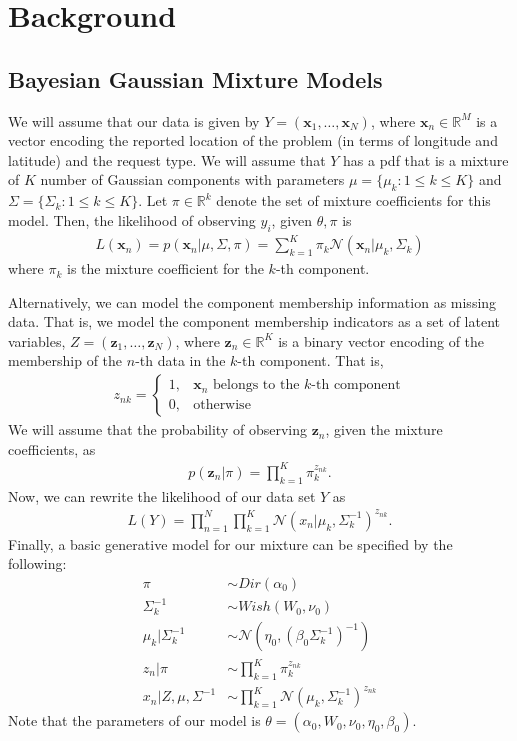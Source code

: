 \documentclass[twoside]{article}
\newcommand{\N}{\mathcal{N}}
\newcommand{\bR}{\mathbb{R}}
\newcommand{\vx}{\mathbf{x}}
\newcommand{\vz}{\mathbf{z}}
\theoremstyle{theorem}
\theoremstyle{theorem}
\theoremstyle{theorem}
\theoremstyle{lemma}
\theoremstyle{definition}
\theoremstyle{example}
\begin{document}
\section{Background}
\subsection{Bayesian Gaussian Mixture Models}
We will assume that our data is given by $Y = (\vx_1,\dots , \vx_N )$, where $\vx_n\in \bR^M$ is a vector encoding the reported location of the problem (in terms of longitude and latitude) and the request type. We will assume that $Y$ has a pdf that is a mixture of $K$ number of Gaussian components with parameters $\mu = \{\mu_k :  1\leq k\leq K\}$ and $\Sigma = \{\Sigma_k :  1\leq k\leq K\}$. Let $\pi \in \bR^k$ denote the set of mixture coefficients for this model. Then, the likelihood of observing $y_i$, given $\theta, \pi$ is
\begin{align}
L(\vx_n) = p(\vx_n | \mu, \Sigma, \pi) = \sum_{k=1}^K\pi_k \N(\vx_n | \mu_k, \Sigma_k )
\end{align}
where $\pi_k$ is the mixture coefficient for the $k$-th component. 

Alternatively, we can model the component membership information as missing data. That is, we model the component membership indicators as a set of latent variables, $Z = (\vz_1, \ldots, \vz_N)$, where $\vz_n \in \bR^K$ is a binary vector encoding of the membership of the $n$-th data in the $k$-th component. That is,
\begin{align}
z_{nk} = \begin{cases}
1, & \vx_n\text{ belongs to the $k$-th component}\\
0, & \text{otherwise}
\end{cases}
\end{align}
We will assume that the probability of observing $\vz_n$, given the mixture coefficients, as
\begin{align}
p(\vz_n | \pi) = \prod_{k=1}^K \pi_k^{z_{nk}}.
\end{align}
Now, we can rewrite the likelihood of our data set $Y$ as
\begin{align}
L(Y) = \prod_{n=1}^N\prod_{k=1}^K \N(x_n| \mu_k, \Sigma^{-1}_k)^{z_{nk}}.
\end{align}
Finally, a basic generative model for our mixture can be specified by the following:
\begin{align}
\pi &\sim Dir(\alpha_0)\\
\Sigma^{-1}_k &\sim Wish(W_0, \nu_0)\\
\mu_k | \Sigma^{-1}_k &\sim \N(\eta_0, (\beta_0 \Sigma^{-1}_k )^{-1})\\
z_n | \pi &\sim \prod_{k=1}^K \pi_k^{z_{nk}}\\
x_n | Z, \mu, \Sigma^{-1} &\sim \prod_{k=1}^K \N(\mu_k, \Sigma^{-1}_k)^{z_{nk}}
\end{align}
Note that the parameters of our model is $\theta = (\alpha_0, W_0, \nu_0, \eta_0, \beta_0)$. 
\end{document}
